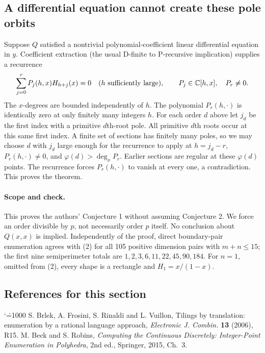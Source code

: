 \documentclass[11pt,a4paper]{article}
\makeatletter
\numberwithin{equation}{section}
\theoremstyle{definition}
\theoremstyle{remark}
\renewenvironment{thebibliography}[1]
 {\subsection*{References for this section}\small
  \list{\@biblabel{\@arabic\c@enumiv}}
       {\settowidth\labelwidth{\@biblabel{#1}}\leftmargin\labelwidth
        \advance\leftmargin\labelsep\@openbib@code
        \usecounter{enumiv}\let\p@enumiv\@empty
        \renewcommand\theenumiv{\@arabic\c@enumiv}}
  \sloppy\clubpenalty4000\widowpenalty4000\sfcode`\.=1000\relax}
 {\def\@noitemerr{\@latex@warning{Empty bibliography}}\endlist}
\makeatother
\begin{document}
\subsection*{A differential equation cannot create these pole orbits}
Suppose $Q$ satisfied a nontrivial polynomial-coefficient linear
differential equation in $y$. Coefficient extraction (the usual
D-finite to P-recursive implication) supplies a recurrence
\[
 \sum_{j=0}^r P_j(h,x)H_{h+j}(x)=0
 \quad(h\hbox{ sufficiently large}),\qquad
 P_j\in\mathbb C[h,x],\quad P_r\ne0.
\]
The $x$-degrees are bounded independently of $h$. The polynomial
$P_r(h,\cdot)$ is identically zero at only finitely many integers $h$.
For each order $d$ above let $j_d$ be the first index with a primitive
$d$th-root pole. All primitive $d$th roots occur at this same first
index. A finite set of sections has finitely many poles, so we may
choose $d$ with $j_d$ large enough for the recurrence to apply at
$h=j_d-r$, $P_r(h,\cdot)\ne0$, and
$\varphi(d)>\deg_x P_r$. Earlier sections are regular at these
$\varphi(d)$ points. The recurrence forces $P_r(h,\cdot)$ to vanish
at every one, a contradiction. This proves the theorem.

\paragraph{Scope and check.}
This proves the authors' Conjecture 1 without assuming Conjecture 2.
We force an order divisible by $p$, not necessarily order $p$
itself. No conclusion about $Q(x,x)$ is implied. Independently of
the proof, direct boundary-pair enumeration agrees with (2) for all
105 positive dimension pairs with $m+n\le15$; the first nine
semiperimeter totals are $1,2,3,6,11,22,45,90,184$. For $n=1$,
omitted from (2), every shape is a rectangle and $H_1=x/(1-x)$.
\begin{thebibliography}{9}
 S. Brlek, A. Frosini, S. Rinaldi and L. Vuillon,
Tilings by translation: enumeration by a rational language approach,
\emph{Electronic J. Combin.} \textbf{13} (2006), R15.
 M. Beck and S. Robins, \emph{Computing the Continuous
Discretely: Integer-Point Enumeration in Polyhedra}, 2nd ed.,
Springer, 2015, Ch.~3.
\end{thebibliography}

\par\endgroup

\begingroup
\end{document}
